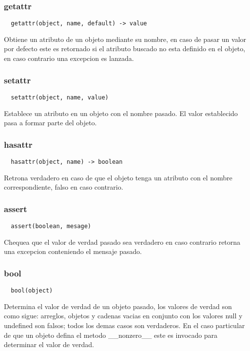 \subsubsection*{getattr}
\begin{verbatim}
  getattr(object, name, default) -> value
\end{verbatim}
Obtiene un atributo de un objeto mediante su nombre, en caso de pasar un valor
por defecto este es retornado si el atributo buscado no esta definido en el
objeto, en caso contrario una excepcion es lanzada.

\subsubsection*{setattr}
\begin{verbatim}
  setattr(object, name, value)
\end{verbatim}
Establece un atributo en un objeto con el nombre pasado. El valor establecido
pasa a formar parte del objeto.

\subsubsection*{hasattr}
\begin{verbatim}
  hasattr(object, name) -> boolean
\end{verbatim}
Retrona verdadero en caso de que el objeto tenga un atributo con el nombre
correspondiente, falso en caso contrario.

\subsubsection*{assert}
\begin{verbatim}
  assert(boolean, mesage)
\end{verbatim}
Chequea que el valor de verdad pasado sea verdadero en caso contrario retorna
una excepcion conteniendo el mensaje pasado.

\subsubsection*{bool}
\begin{verbatim}
  bool(object)
\end{verbatim}
Determina el valor de verdad de un objeto pasado, los valores de verdad son como
sigue: arreglos, objetos y cadenas vacias en conjunto con los valores null y
undefined son falsos; todos los demas casos son verdaderos.
En el caso particular de que un objeto defina el metodo __nonzero__ este es
invocado para determinar el valor de verdad.

